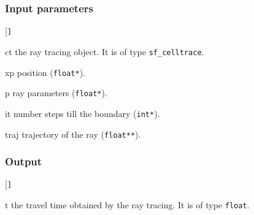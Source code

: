 \subsubsection*{Input parameters}
\begin{desclist}{\tt }{\quad}[\tt ]
   \setlength\itemsep{0pt}
   \item[ct]   the ray tracing object. It is of type \texttt{sf\_celltrace}. 
   \item[xp]   position (\texttt{float*}).  
   \item[p]    ray parameters (\texttt{float*}).  
   \item[it]   number steps till the boundary (\texttt{int*}).  
   \item[traj] trajectory of the ray (\texttt{float**}).  
\end{desclist}

\subsubsection*{Output}
\begin{desclist}{\tt }{\quad}[\tt ]
   \setlength\itemsep{0pt}
   \item[t] the travel time obtained by the ray tracing. It is of type \texttt{float}.
\end{desclist}


